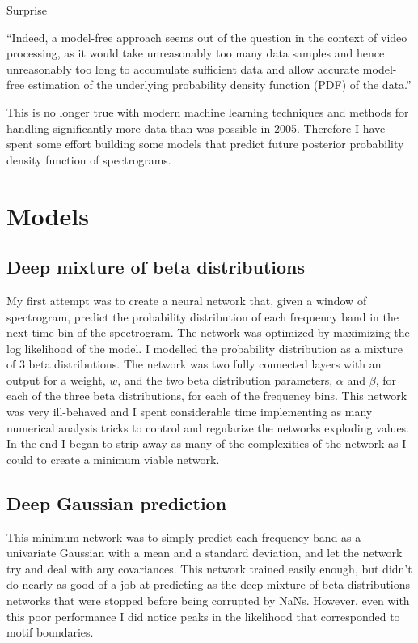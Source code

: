 Surprise

``Indeed, a model-free approach seems out of the question in the context of video processing, as it would take unreasonably too many data samples and hence unreasonably too long to accumulate sufficient data and allow accurate model-free estimation of the underlying probability density function (PDF) of the data.''\cite{itti2005principled}

This is no longer true with modern machine learning techniques and methods for handling significantly more data than was possible in 2005. Therefore I have spent some effort building some models that predict future posterior probability density function of spectrograms.

\section{Models}

\subsection{Deep mixture of beta distributions}
My first attempt was to create a neural network that, given a window of spectrogram, predict the probability distribution of each frequency band in the next time bin of the spectrogram. The network was optimized by maximizing the log likelihood of the model. I modelled the probability distribution as a mixture of 3 beta distributions. The network was two fully connected layers with an output for a weight, $w$, and the two beta distribution parameters, $\alpha$ and $\beta$, for each of the three beta distributions, for each of the frequency bins. This network was very ill-behaved and I spent considerable time implementing as many numerical analysis tricks to control and regularize the networks exploding values. In the end I began to strip away as many of the complexities of the network as I could to create a minimum viable network.

\subsection{Deep Gaussian prediction}
This minimum network was to simply predict each frequency band as a univariate Gaussian with a mean and a standard deviation, and let the network try and deal with any covariances. This network trained easily enough, but didn't do nearly as good of a job at predicting as the deep mixture of beta distributions networks that were stopped before being corrupted by NaNs. However, even with this poor performance I did notice peaks in the likelihood that corresponded to motif boundaries.


